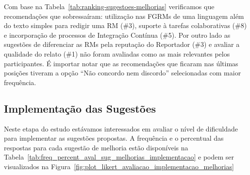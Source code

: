 Com base na Tabela~\ref{tab:ranking-sugestoes-melhorias} verificamos que
recomendações que sobressaíram: utilização nas FGRMs de uma linguagem além do
texto simples para redigir uma RM (\#3), suporte à tarefas colaborativas (\#8)
e incorporação de processos de Integração Contínua (\#5). Por outro lado as
sugestões de diferenciar as RMs pela reputação do Reportador (\#3) e avaliar a
qualidade do relato (\#1) não foram avaliadas como as mais relevantes pelos
participantes. É importar notar que as recomendações que ficaram nas últimas
posições tiveram a opção ``Não concordo nem discordo'' selecionadas com maior
frequência.

\begin{table}[htpb]
\centering
{}
\caption{Ranking das sugestões propostas}
\label{tab:ranking-sugestoes-melhorias}
\end{table}

\subsection{Implementação das Sugestões}
\label{sub:sug_melhorias_resultados_implementacao}

Neste etapa do estudo estávamos interessados em avaliar o nível de dificuldade
para implementar as sugestões propostas. A frequência e o percentual das
respostas para cada sugestão de melhoria estão disponíveis na
Tabela~\ref{tab:freq_percent_aval_sug_melhorias_implementacao} e podem ser
visualizados na Figura~\ref{fig:plot_likert_avaliacao_implementacao_melhorias}

